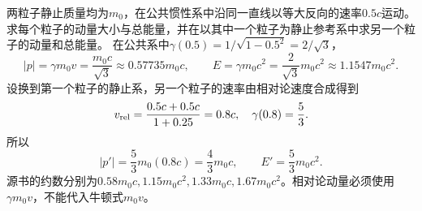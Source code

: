 \problemtext 两粒子静止质量均为$m_0$，在公共惯性系中沿同一直线以等大反向的速率$0.5c$运动。求每个粒子的动量大小与总能量，并在以其中一个粒子为静止参考系中求另一个粒子的动量和总能量。
\workings
在公共系中$\gamma(0.5)=1/\sqrt{1-0.5^2}=2/\sqrt3$，
\[
\boxed{|p|=\gamma m_0v=\frac{m_0c}{\sqrt3}\approx0.57735m_0c},
\qquad
\boxed{E=\gamma m_0c^2=\frac2{\sqrt3}m_0c^2\approx1.1547m_0c^2}.
\]
设换到第一个粒子的静止系，另一个粒子的速率由相对论速度合成得到
\[
v_{\rm rel}=\frac{0.5c+0.5c}{1+0.25}=0.8c,
\quad
\gamma(0.8)=\frac53.
\]
所以
\[
\boxed{|p'|=\frac53m_0(0.8c)=\frac43m_0c},
\qquad
\boxed{E'=\frac53m_0c^2}.
\]
\crosscheck 源书的约数分别为$0.58m_0c,1.15m_0c^2,1.33m_0c,1.67m_0c^2$。相对论动量必须使用$\gamma m_0v$，不能代入牛顿式$m_0v$。
